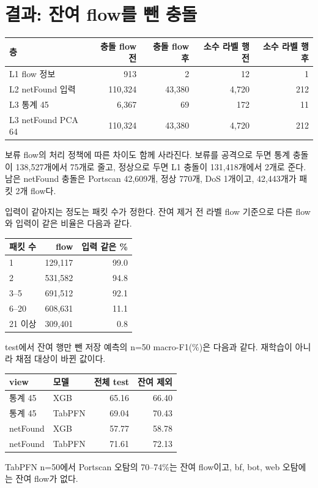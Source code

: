 \section{결과: 잔여 flow를 뺀 충돌}
\begin{center}\small
\begin{tabular}{lrrrr}
\toprule
층 & 충돌 flow 전 & 충돌 flow 후 & 소수 라벨 행 전 & 소수 라벨 행 후\\\midrule
L1 flow 정보 & 913 & 2 & 12 & 1\\
L2 netFound 입력 & 110,324 & 43,380 & 4,720 & 212\\
L3 통계 45 & 6,367 & 69 & 172 & 11\\
L3 netFound PCA 64 & 110,324 & 43,380 & 4,720 & 212\\
\bottomrule
\end{tabular}
\end{center}
보류 flow의 처리 정책에 따른 차이도 함께 사라진다. 보류를 공격으로 두면 통계 충돌이 138,527개에서 75개로 줄고, 정상으로 두면 L1 충돌이 131,418개에서 2개로 준다. 남은 netFound 충돌은 Portscan 42,609개, 정상 770개, DoS 1개이고, 42,443개가 패킷 2개 flow다.

입력이 같아지는 정도는 패킷 수가 정한다. 잔여 제거 전 라벨 flow 기준으로 다른 flow와 입력이 같은 비율은 다음과 같다.
\begin{center}\small
\begin{tabular}{lrr}
\toprule
패킷 수 & flow & 입력 같은 \%\\\midrule
1 & 129,117 & 99.0\\
2 & 531,582 & 94.8\\
3--5 & 691,512 & 92.1\\
6--20 & 608,631 & 11.1\\
21 이상 & 309,401 & 0.8\\
\bottomrule
\end{tabular}
\end{center}

test에서 잔여 행만 뺀 저장 예측의 n=50 macro-F1(\%)은 다음과 같다. 재학습이 아니라 채점 대상이 바뀐 값이다.
\begin{center}\small
\begin{tabular}{llrr}
\toprule
view & 모델 & 전체 test & 잔여 제외\\\midrule
통계 45 & XGB & 65.16 & 66.40\\
통계 45 & TabPFN & 69.04 & 70.43\\
netFound & XGB & 57.77 & 58.78\\
netFound & TabPFN & 71.61 & 72.13\\
\bottomrule
\end{tabular}
\end{center}
TabPFN n=50에서 Portscan 오탐의 70--74\%는 잔여 flow이고, bf, bot, web 오탐에는 잔여 flow가 없다.

